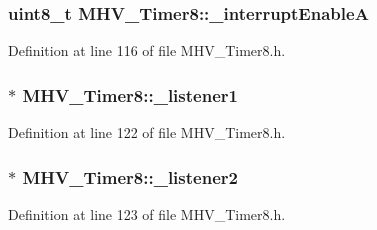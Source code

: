 \hypertarget{class_m_h_v___timer8_ad2fac7586dc6104b1c7323c84ba88559}{
\subsubsection[{\-\_\-interrupt\-Enable\-A}]{\setlength{\rightskip}{0pt plus 5cm}uint8\-\_\-t {\bf \-M\-H\-V\-\_\-\-Timer8\-::\-\_\-interrupt\-Enable\-A}}}
\label{class_m_h_v___timer8_ad2fac7586dc6104b1c7323c84ba88559}


\-Definition at line 116 of file \-M\-H\-V\-\_\-\-Timer8.\-h.

\hypertarget{class_m_h_v___timer8_a055679c1951c9667749f71e549eb8ccf}{
\subsubsection[{\-\_\-listener1}]{$\ast$ {\bf \-M\-H\-V\-\_\-\-Timer8\-::\-\_\-listener1}}}
\label{class_m_h_v___timer8_a055679c1951c9667749f71e549eb8ccf}


\-Definition at line 122 of file \-M\-H\-V\-\_\-\-Timer8.\-h.

\hypertarget{class_m_h_v___timer8_a3e44a703c1e5c578fb98294f560337b3}{
\subsubsection[{\-\_\-listener2}]{$\ast$ {\bf \-M\-H\-V\-\_\-\-Timer8\-::\-\_\-listener2}}}
\label{class_m_h_v___timer8_a3e44a703c1e5c578fb98294f560337b3}


\-Definition at line 123 of file \-M\-H\-V\-\_\-\-Timer8.\-h.

